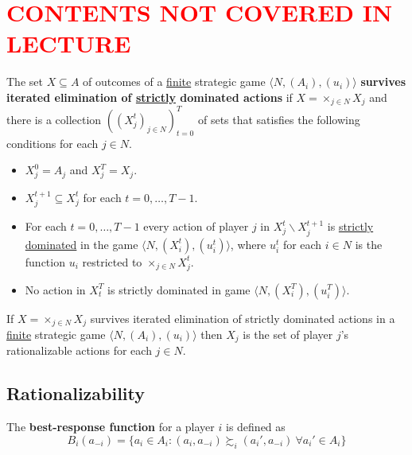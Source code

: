 \documentclass[11pt]{article}
\newcommand{\red}[1]{\textcolor{red}{#1}}
\begin{document}
	\section*{\red{CONTENTS NOT COVERED IN LECTURE}}
	\begin{definition}[60.2]
				The set $X \subseteq A$ of outcomes of a \ul{finite} strategic game $\langle N, (A_i), (u_i) \rangle$ \textbf{survives iterated elimination of \ul{strictly} dominated actions} if $X = \times_{j \in N} X_j$ and there is a collection $((X_j^t)_{j \in N})_{t=0}^T$ of sets that satisfies the following conditions for each $j \in N$.
				\begin{itemize}
					\item $X_j^0 = A_j$ and $X_j^T = X_j$.
					\item $X_j^{t+1} \subseteq X_j^t$ for each $t = 0, \dots, T - 1$.
					\item For each $t = 0, \dots, T-1$ every action of player $j$ in $X_j^t \backslash X_j^{t+1}$ is \ul{strictly dominated} in the game $\langle N, (X_i^t), (u_i^t) \rangle$, where $u_i^t$ for each $i \in N$ is the function $u_i$ restricted to $\times_{j \in N} X_j^t$.
					\item No action in $X_t^T$ is strictly dominated in game $\langle N, (X_i^T), (u_i^T) \rangle$.
				\end{itemize}
			\end{definition}
			
			\begin{proposition}[61.2]
				If $X = \times_{j \in N}X_j$ survives iterated elimination of strictly dominated actions in a \ul{finite} strategic game $\langle N, (A_i), (u_i) \rangle$ then $X_j$ is the set of player $j$'s rationalizable actions for each $j \in N$.
			\end{proposition}
			
		\subsection{Rationalizability}
			\begin{definition}[pg.15]
				The \textbf{best-response function} for a player $i$ is defined as
				\[
					B_i(a_{-i}) = \{a_i \in A_i : (a_i, a_{-i}) \succsim_i (a_i', a_{-i})\ \forall a_i' \in A_i \}
				\]
			\end{definition}
			
\end{document}
